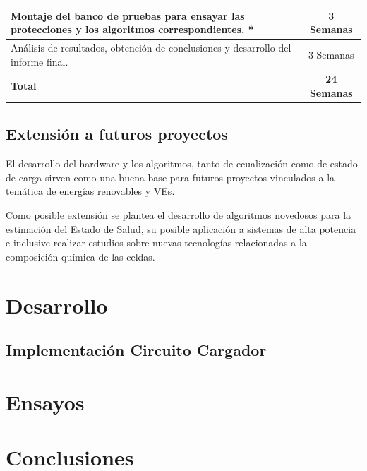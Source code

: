 \documentclass[10pt,a4paper]{article}
\begin{document}
\begin{table}[h!]
\begin{tabular}{|l|c|}
			Montaje del banco de pruebas para ensayar las protecciones y los algoritmos correspondientes. *                                                                                                                       & 3 Semanas                          \\ \hline
			Análisis de resultados, obtención de conclusiones y desarrollo del informe final.                                                                                                                                                       & 3 Semanas                          \\ \hline
			\textbf{Total}                                                                                                                                                                                                  &\textbf{24 Semanas} \\ \hline
    \end{tabular}
\end{table}

\subsection{Extensión a futuros proyectos}

El desarrollo del hardware y los algoritmos, tanto de ecualización como de
estado de carga sirven como una buena base para futuros proyectos vinculados a
la temática de energías renovables y \acrshort{VE}s.

Como posible extensión se plantea el desarrollo de algoritmos novedosos para la
estimación del Estado de Salud, su posible aplicación a sistemas de alta
potencia e inclusive realizar estudios sobre nuevas tecnologías relacionadas a
la composición química de las celdas.

\newpage

\section{Desarrollo}\label{desarrollo}
\subsection{Implementación Circuito Cargador}



\section{Ensayos}\label{ensayos}
\newpage

\section{Conclusiones}\label{conclusiones}
\printbibliography
\newpage
\glsaddall
\printnoidxglossary[type=\acronymtype,title={Abreviaturas}]
\end{document}
